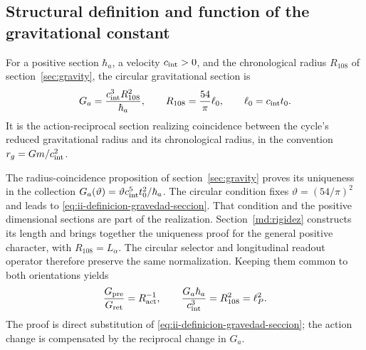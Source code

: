 \subsection{Structural definition and function of the gravitational constant}
\label{sec:ii-definicion-gravedad}

\begin{definition}
For a positive section \(\hbar_a\), a velocity
\(c_{\rm int}>0\), and the chronological radius \(R_{108}\) of
section~\ref{sec:gravity}, the circular gravitational section is
\begin{equation}
 G_a=\frac{c_{\rm int}^{3}R_{108}^{2}}{\hbar_a},
 \qquad R_{108}=\frac{54}{\pi}\ell_0,
 \qquad \ell_0=c_{\rm int}t_0.
 \label{eq:ii-definicion-gravedad-seccion}
\end{equation}
It is the action-reciprocal section realizing coincidence
between the cycle's reduced gravitational radius and its
chronological radius, in the convention \(r_g=Gm/c_{\rm int}^2\).
\end{definition}

The radius-coincidence proposition of
section~\ref{sec:gravity} proves its uniqueness in the collection
\(G_a(\vartheta)=\vartheta c_{\rm int}^{5}t_0^2/\hbar_a\).
The circular condition fixes \(\vartheta=(54/\pi)^2\) and leads
to \eqref{eq:ii-definicion-gravedad-seccion}. That condition and the
positive dimensional sections are part of the realization.
Section~\ref{md:rigidez} constructs its length and brings together
the uniqueness proof for the general positive character, with
$R_{108}=L_\alpha$. The circular selector and longitudinal readout
operator therefore preserve the same normalization.
Keeping them common to both orientations yields
\begin{equation}
 \frac{G_{\mathrm{pre}}}{G_{\mathrm{ret}}}
 =R_{\mathrm{act}}^{-1},
 \qquad
 \frac{G_a\hbar_a}{c_{\rm int}^{3}}
 =R_{108}^{2}=\ell_P^2.
 \label{eq:ii-definicion-gravedad-area}
\end{equation}
The proof is direct substitution of
\eqref{eq:ii-definicion-gravedad-seccion}; the action change
is compensated by the reciprocal change in \(G_a\).
